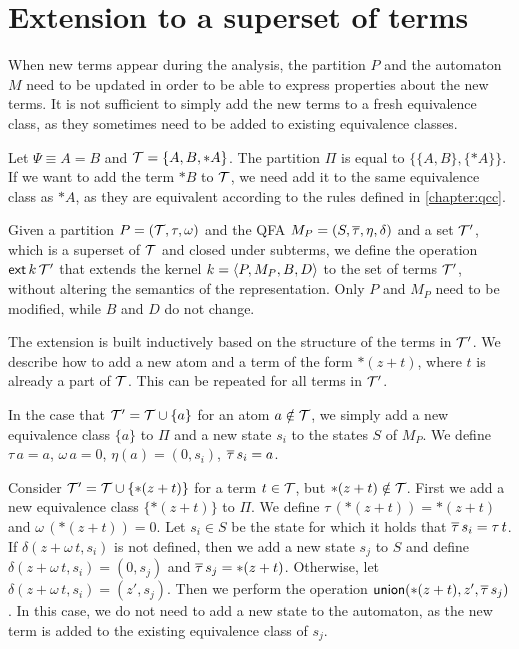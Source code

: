 \section{Extension to a superset of terms}

When new terms appear during the analysis, the partition $P$ and the automaton $M$ need to be updated
in order to be able to express properties about the new terms.
It is not sufficient to simply add the new terms to a fresh equivalence class,
as they sometimes need to be added to existing equivalence classes.

\begin{example}
    Let $\Psi \equiv A = B$ and $\mathcal{T} = \{A, B, *A\}$.
    The partition $\Pi$ is equal to $\{\{A, B\}, \{*A\}\}$.
    If we want to add the term $*B$ to $\mathcal{T}$, we need add it to the same equivalence class as $*A$,
    as they are equivalent according to the rules defined in \cref{chapter:qcc}.
\end{example}

Given a partition $P = (\mathcal{T}, \tau, \omega)$ and the QFA $M_P = (S, \overline{\tau}, \eta, \delta)$ and a set $\mathcal{T}'$, which is a superset of $\mathcal{T}$ and closed under subterms,
we define the operation $\textsf{ext}\,{k}\,{\mathcal{T}'}$ that extends the kernel $k = \langle P, M_P, B, D\rangle$ to the set of terms $\mathcal{T}'$,
without altering the semantics of the representation.
Only $P$ and $M_P$ need to be modified, while $B$ and $D$ do not change.

The extension is built inductively based on the structure of the terms in $\mathcal{T}'$.
We describe how to add a new atom and a term of the form $*(z+t)$, where $t$ is already a part of $\mathcal{T}$.
This can be repeated for all terms in $\mathcal{T}'$.

In the case that $\mathcal{T}' = \mathcal{T} \cup \{a\}$ for an atom $a \notin \mathcal{T}$, we simply add a new
equivalence class $\{a\}$ to $\Pi$ and a new state $s_i$ to the states $S$ of $M_P$.
We define $\tau\,a = a$, $\omega\,a=0$, $\eta(a) = (0,s_i)$, $\overline{\tau}\,s_i = a$.

Consider $\mathcal{T}' = \mathcal{T} \cup \{*(z+t)\}$ for a term $t \in \mathcal{T}$, but $*(z + t) \notin \mathcal{T}$.
First we add a new equivalence class $\{*(z+t)\}$ to $\Pi$.
We define $\tau\,(*(z+t)) = *(z+t)$ and $\omega\,(*(z+t))=0$.
Let $s_i \in S$ be the state for which it holds that $\overline{\tau}\,s_i = \tau\,t$.
If $\delta(z + \omega\,t,s_i)$ is not defined, then we add a new state $s_j$ to $S$
and define $\delta(z + \omega\,t, s_i) = (0, s_j)$ and $\overline{\tau}\,s_j = *(z+t)$.
Otherwise, let $\delta(z + \omega\,t, s_i) = (z', s_j)$.
Then we perform the operation $\textsf{union}(*(z + t), z', \overline{\tau}\,s_j)$.
In this case, we do not need to add a new state to the automaton,
as the new term is added to the existing equivalence class of $s_j$.
